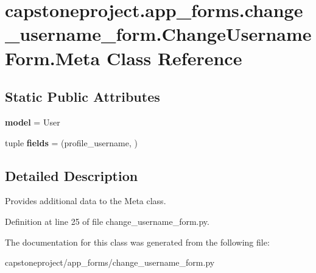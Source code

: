 \hypertarget{classcapstoneproject_1_1app__forms_1_1change__username__form_1_1_change_username_form_1_1_meta}{}\section{capstoneproject.\+app\+\_\+forms.\+change\+\_\+username\+\_\+form.\+Change\+Username\+Form.\+Meta Class Reference}
\label{classcapstoneproject_1_1app__forms_1_1change__username__form_1_1_change_username_form_1_1_meta}
\subsection*{Static Public Attributes}
\begin{DoxyCompactItemize}
\item 
\mbox{\label{classcapstoneproject_1_1app__forms_1_1change__username__form_1_1_change_username_form_1_1_meta_a8d3c29275a063d0aeb67327be37954d9}} 
{\bfseries model} = User
\item 
\mbox{\label{classcapstoneproject_1_1app__forms_1_1change__username__form_1_1_change_username_form_1_1_meta_a0463093d08ed094cd81684cb8e7f1bf1}} 
tuple {\bfseries fields} = (\textquotesingle{}profile\+\_\+username\textquotesingle{}, )
\end{DoxyCompactItemize}


\subsection{Detailed Description}
\begin{DoxyVerb}Provides additional data to the Meta class.
\end{DoxyVerb}
 

Definition at line 25 of file change\+\_\+username\+\_\+form.\+py.



The documentation for this class was generated from the following file\+:\begin{DoxyCompactItemize}
\item 
capstoneproject/app\+\_\+forms/change\+\_\+username\+\_\+form.\+py\end{DoxyCompactItemize}
